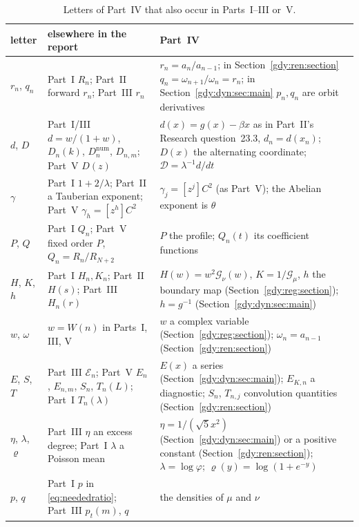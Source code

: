 \documentclass[11pt]{article}
\numberwithin{equation}{section}
\theoremstyle{definition}
\theoremstyle{remark}
\begin{document}
\begin{table}[htbp]
\centering\footnotesize
\caption{Letters of Part~IV that also occur in Parts~I--III or~V.}\label{gdy:tab:notation}
\begin{tabular}{@{}l>{\raggedright\arraybackslash}p{}>{\raggedright\arraybackslash}p{}@{}}
\toprule
letter & elsewhere in the report & Part~IV\\
\midrule
$r_n$, $q_n$ & Part~I $R_n$; Part~II forward $r_n$; Part~III $r_n$
 & $r_n=a_n/a_{n-1}$; in Section~\ref{gdy:ren:section}
 $q_n=\omega_{n+1}/\omega_n=r_n$; in Section~\ref{gdy:dyn:sec:main}
 $p_n,q_n$ are orbit derivatives\\
$d$, $D$ & Part~I/III $d=w/(1+w)$, $D_n(k)$, $D_n^{\mathrm{num}}$,
 $D_{n,m}$; Part~V $D(z)$
 & $d(x)=g(x)-\beta x$ as in Part~II's Research question~23.3,
 $d_n=d(x_n)$; $D(x)$ the alternating coordinate; $\mathcal D=\lambda^{-1}d/dt$\\
$\gamma$ & Part~I $1+2/\lambda$; Part~II a Tauberian exponent;
 Part~V $\gamma_h=[z^h]C^2$
 & $\gamma_j=[z^j]C^2$ (as Part~V); the Abelian exponent is $\theta$\\
$P$, $Q$ & Part~I $Q_n$; Part~V fixed order $P$, $Q_n=R_n/R_{N+2}$
 & $P$ the profile; $Q_n(t)$ its coefficient functions\\
$H$, $K$, $h$ & Part~I $H_n,K_n$; Part~II $H(s)$; Part~III $H_n(r)$
 & $H(w)=w^2\mathcal G_\nu(w)$, $K=1/\mathcal G_\mu$, $h$ the boundary
 map (Section~\ref{gdy:reg:section}); $h=g^{-1}$
 (Section~\ref{gdy:dyn:sec:main})\\
$w$, $\omega$ & $w=W(n)$ in Parts~I, III, V
 & $w$ a complex variable (Section~\ref{gdy:reg:section});
 $\omega_n=a_{n-1}$ (Section~\ref{gdy:ren:section})\\
$E$, $S$, $T$ & Part~III $\mathcal E_n$; Part~V $E_n$, $E_{n,m}$, $S_n$,
 $T_n(L)$; Part~I $T_n(\lambda)$
 & $E(x)$ a series (Section~\ref{gdy:dyn:sec:main}); $E_{K,n}$ a
 diagnostic; $S_n$, $T_{n,j}$ convolution quantities
 (Section~\ref{gdy:ren:section})\\
$\eta$, $\lambda$, $\varrho$ & Part~III $\eta$ an excess degree; Part~I
 $\lambda$ a Poisson mean
 & $\eta=1/(\sqrt5x^2)$ (Section~\ref{gdy:dyn:sec:main}) or a positive
 constant (Section~\ref{gdy:ren:section}); $\lambda=\log\varphi$;
 $\varrho(y)=\log(1+e^{-y})$\\
$p$, $q$ & Part~I $p$ in \eqref{eq:neededratio}; Part~III $p_t(m)$, $q$
 & the densities of $\mu$ and $\nu$\\
\bottomrule
\end{tabular}
\end{table}
\end{document}
